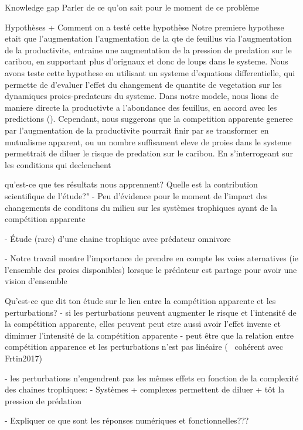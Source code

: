 Knowledge gap
Parler de ce qu'on sait pour le moment de ce problème \cite{chaguaceda2021}


Hypothèses + Comment on a testé cette hypothèse
Notre premiere hypothese etait que l'augmentation l'augmentation de la qte de feuillus via l'augmentation de la productivite, entraine une augmentation de la pression de predation sur le caribou, en supportant plus d'orignaux et donc de loups dans le systeme. Nous avons teste cette hypothese en utilisant un systeme d'equations differentielle, qui permette de d'evaluer l'effet du changement de quantite de vegetation sur les dynamiques proies-predateurs du systeme. Dans notre modele, nous lions de maniere directe la productivte a l'abondance des feuillus, en accord avec les predictions (\textcolor{trouver ref}). Cependant, nous suggerons que la competition apparente generee par l'augmentation de la productivite pourrait finir par se transformer en mutualisme apparent, ou un nombre suffisament eleve de proies dans le systeme permettrait de diluer le risque de predation sur le caribou. En s'interrogeant sur les conditions qui declenchent 

qu'est-ce que tes résultats nous apprennent? Quelle est la contribution scientifique de l'étude?" 
- Peu d'évidence pour le moment de l'impact des changements de conditons du milieu sur les systèmes trophiques ayant de la compétition apparente \cite{chaguaceda2021}

- Étude (rare) d'une chaine trophique avec prédateur omnivore \cite{chaguaceda2021}

- Notre travail montre l'importance de prendre en compte les voies aternatives (ie l'ensemble des proies disponibles) lorsque le prédateur est partage pour avoir une vision d'ensemble



Qu'est-ce que dit ton étude sur le lien entre la compétition apparente et les perturbations?
- si les perturbations peuvent augmenter le risque et l'intensité de la compétition apparente, elles peuvent peut etre aussi avoir l'effet inverse et diminuer l'intensité de la compétition apparente
- peut être que la relation entre compétition apparence et les perturbations n'est pas linéaire (~ cohérent avec Frtin2017)

- les perturbations n'engendrent pas les mêmes effets en fonction de la complexité des chaines trophiques:
	- Systèmes + complexes permettent de diluer + tôt la pression de prédation 


	- Expliquer ce que sont les réponses numériques et fonctionnelles???